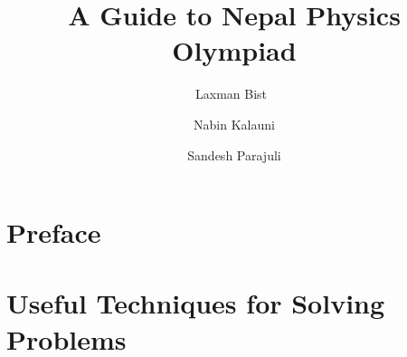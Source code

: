 \documentclass[a4paper, 12pt, twoside]{book}
\begin{document}
\frontmatter


\pagestyle{empty}
\title{\textbf{A Guide to Nepal Physics Olympiad}}
\author{
   Laxman Bist\
   \and
   Nabin Kalauni\\
   \and
   Sandesh Parajuli\\
}
\date{}
\maketitle



\chapter*{Preface}
\pagestyle{plain}

\chapter*{Useful Techniques for Solving Problems}

\tableofcontents

\mainmatter



% 





\end{document}
